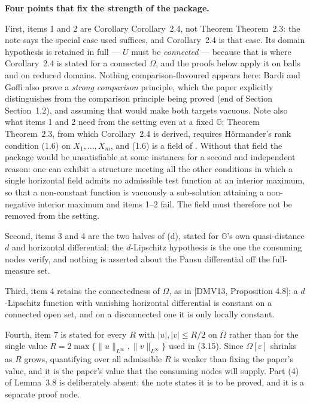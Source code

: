 \begin{definition}
\medskip\noindent\textbf{Four points that fix the strength of the package.}

First, items 1 and 2 are Corollary Corollary~2.4, not Theorem Theorem~2.3: the note says the
special case used suffices, and Corollary~2.4 is that case. Its domain hypothesis is retained in
full --- $U$ must be \emph{connected} --- because that is where Corollary~2.4 is stated for a
connected $\Omega$, and the proofs below apply it on balls and on reduced domains. Nothing
comparison-flavoured appears here: Bardi and Goffi also prove a \emph{strong comparison}
principle, which the paper explicitly distinguishes from the comparison principle being
proved (end of Section Section~1.2), and assuming that would make both targets vacuous.
Note also what items 1 and 2 need from the setting even at a fixed $\mathbb G$: Theorem
Theorem~2.3, from which Corollary~2.4 is derived, requires Hörmander's rank condition (1.6)
on $X_1,\ldots,X_m$, and (1.6) is a field of . Without that field
the package would be unsatisfiable at some instances for a second and independent reason: one
can exhibit a structure meeting all the other conditions in which a single horizontal field
admits no admissible test function at an interior maximum, so that a non-constant function is
vacuously a sub-solution attaining a non-negative interior maximum and items 1--2 fail. The
field must therefore not be removed from the setting.

Second, items 3 and 4 are the two halves of (d), stated for $\mathbb G$'s own quasi-distance
$d$ and horizontal differential; the $d$-Lipschitz hypothesis is the one the consuming nodes
verify, and nothing is asserted about the Pansu differential off the full-measure set.

Third, item 4 retains the connectedness of $\Omega$, as in [DMV13, Proposition 4.8]: a
$d$-Lipschitz function with vanishing horizontal differential is constant on a connected
open set, and on a disconnected one it is only locally constant.

Fourth, item 7 is stated for every $R$ with $|u|,|v|\le R/2$ on $\overline\Omega$ rather
than for the single value $R=2\max\{\|u\|_{L^\infty},\|v\|_{L^\infty}\}$ used in (3.15).
Since $\Omega[\varepsilon]$ shrinks as $R$ grows, quantifying over all admissible $R$ is
weaker than fixing the paper's value, and it is the paper's value that the consuming nodes
will supply. Part (4) of Lemma~3.8 is deliberately absent: the note states it is to be
proved, and it is a separate proof node.


\end{definition}
